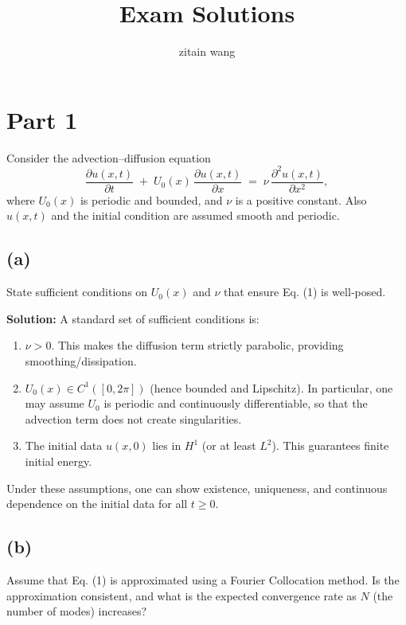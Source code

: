 \documentclass{article}
\title{Exam Solutions}
\author{zitain wang}
\begin{document}

\maketitle

\section*{Part 1}
Consider the advection–diffusion equation
\[
    \frac{\partial u(x, t)}{\partial t} \;+\; U_0(x)\,\frac{\partial u(x, t)}{\partial x}
    \;=\; \nu\,\frac{\partial^2 u(x, t)}{\partial x^2},
\]
where $U_0(x)$ is periodic and bounded, and $\nu$ is a positive constant. Also $u(x, t)$ and the initial condition are assumed smooth and periodic.

\subsection*{(a)}
State sufficient conditions on $U_0(x)$ and $\nu$ that ensure Eq. (1) is well‐posed.

\textbf{Solution:}
A standard set of sufficient conditions is:
\begin{enumerate}
    \item $\displaystyle \nu > 0$.  This makes the diffusion term strictly parabolic, providing smoothing/dissipation.
    \item $\displaystyle U_0(x)\in C^1([0,2\pi])$ (hence bounded and Lipschitz).  In particular, one may assume $U_0$ is periodic and continuously differentiable, so that the advection term does not create singularities.
    \item The initial data $u(x,0)$ lies in $H^1$ (or at least $L^2$).  This guarantees finite initial energy.
\end{enumerate}
Under these assumptions, one can show existence, uniqueness, and continuous dependence on the initial data for all $t\ge0$.

\subsection*{(b)}
Assume that Eq. (1) is approximated using a Fourier Collocation method. Is the approximation consistent, and what is the expected convergence rate as $N$ (the number of modes) increases?
\end{document}
